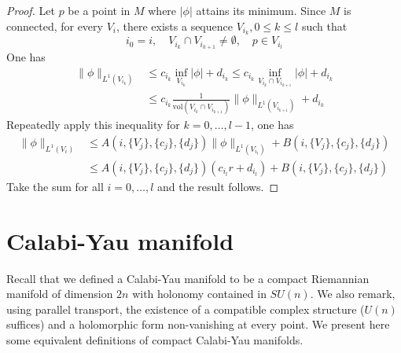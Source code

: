 \documentclass[11pt]{article}
\begin{document}
\begin{proof}
Let \(p\) be a point in \(M\) where \(|\phi|\) attains its minimum. Since \(M\) is connected, for every \(V_i\), there exists a sequence \(V_{i_k}, 0\leq k\leq l\) such that
\[
i_0 = i,\quad V_{i_k}\cap V_{i_{k+1}}\ne \emptyset,\quad p\in V_{i_l}
\]
One has
\begin{align*}
\|\phi\|_{L^1(V_{i_k})} &\leq c_{i_k} \inf_{V_{i_k}} |\phi| + d_{i_k} \leq  c_{i_k} \inf_{V_{i_k}\cap V_{i_{k+1}}} |\phi| + d_{i_k}\\
 &\leq c_{i_k}\frac{1}{\text{vol}(V_{i_k}\cap V_{i_{k+1}})}\|\phi\|_{L^1(V_{i_{k+1}})} + d_{i_k}
\end{align*}
Repeatedly apply this inequality for \(k=0,\dots,l-1\), one has
\begin{align*}
\|\phi\|_{L^1(V_i)} &\leq A(i,\{V_j\},\{c_j\}, \{d_j\}) \|\phi\|_{L^1(V_{i_l})} + B(i,\{V_j\},\{c_j\}, \{d_j\})\\
&\leq A(i,\{V_j\},\{c_j\}, \{d_j\}) (c_{i_l} r+ d_{i_l}) + B(i,\{V_j\},\{c_j\}, \{d_j\})
\end{align*}
Take the sum for all \(i=0,\dots, l\) and the result follows.
\end{proof}








\section{Calabi-Yau manifold}
\label{sec:org222814e}
Recall that we defined a Calabi-Yau manifold to be a compact Riemannian manifold of dimension \(2n\)
with holonomy contained in \(SU(n)\). We also remark, using parallel transport, the existence of a compatible
complex structure (\(U(n)\) suffices) and a holomorphic form non-vanishing at every point. We present
here some equivalent definitions of compact Calabi-Yau manifolds.
\end{document}
